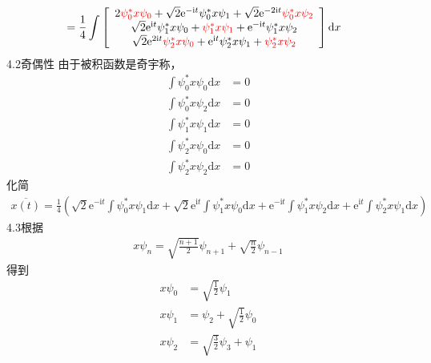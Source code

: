 \begin{equation}
\begin{aligned}
\\
&=\frac{1}{4}\int{\left[ \begin{array}{c}
	2{\color[RGB]{240, 0, 0} \psi _{0}^{*}x\psi _0}+\sqrt{2}\mathrm{e}^{-\mathrm{i}t}\psi _{0}^{*}x\psi _1+\sqrt{2}\mathrm{e}^{-2\mathrm{i}t}{\color[RGB]{240, 0, 0} \psi _{0}^{*}x\psi _2}\\
	\sqrt{2}\mathrm{e}^{\mathrm{i}t}\psi _{1}^{*}x\psi _0+{\color[RGB]{240, 0, 0} \psi _{1}^{*}x\psi _1}+\mathrm{e}^{-\mathrm{i}t}\psi _{1}^{*}x\psi _2\\
	\sqrt{2}\mathrm{e}^{2\mathrm{i}t}{\color[RGB]{240, 0, 0} \psi _{2}^{*}x\psi _0}+\mathrm{e}^{\mathrm{i}t}\psi _{2}^{*}x\psi _1+{\color[RGB]{240, 0, 0} \psi _{2}^{*}x\psi _2}\\
\end{array} \right] \mathrm{d}x}
    \end{aligned}
\end{equation}
4.2奇偶性
由于被积函数是奇宇称，
\begin{equation}
    \begin{aligned}
        \int{\psi _{0}^{*}x\psi _0\mathrm{d}x}&=0
\\
\int{\psi _{0}^{*}x\psi _2\mathrm{d}x}&=0
\\
\int{\psi _{1}^{*}x\psi _1\mathrm{d}x}&=0
\\
\int{\psi _{2}^{*}x\psi _0\mathrm{d}x}&=0
\\
\int{\psi _{2}^{*}x\psi _2\mathrm{d}x}&=0
    \end{aligned}
\end{equation}
化简
\begin{equation}
    \begin{aligned}
        \overline{x(t)}=\frac{1}{4}\left( \sqrt{2}\mathrm{e}^{-\mathrm{i}t}\int{\psi _{0}^{*}x\psi _1\mathrm{d}x}+\sqrt{2}\mathrm{e}^{\mathrm{i}t}\int{\psi _{1}^{*}x\psi _0\mathrm{d}x}+\mathrm{e}^{-\mathrm{i}t}\int{\psi _{1}^{*}x\psi _2\mathrm{d}x}+\mathrm{e}^{\mathrm{i}t}\int{\psi _{2}^{*}x\psi _1\mathrm{d}x} \right) 
    \end{aligned}
\end{equation}
4.3根据
\begin{equation}
    \begin{aligned}
        x\psi _n=\sqrt{\frac{n+1}{2}}\psi _{n+1}+\sqrt{\frac{n}{2}}\psi _{n-1}
    \end{aligned}
\end{equation}
得到
\begin{equation}
    \begin{aligned}
        x\psi _0&=\sqrt{\frac{1}{2}}\psi _1
\\
x\psi _1&=\psi _2+\sqrt{\frac{1}{2}}\psi _0
\\
x\psi _2&=\sqrt{\frac{3}{2}}\psi _3+\psi _1
    \end{aligned}
\end{equation}


